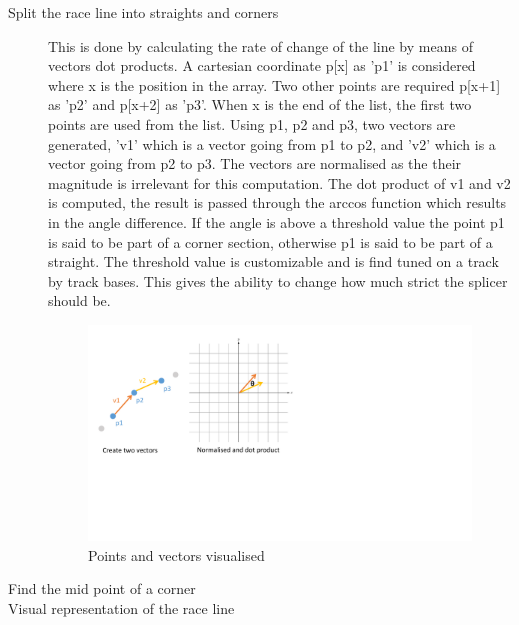 \begin{description}
	\item [Split the race line into straights and corners] This is done by calculating the rate of change of the line by means of vectors dot products. A cartesian coordinate p[x] as 'p1' is considered where x is the position in the array. Two other points are required p[x+1] as 'p2' and p[x+2] as 'p3'. When x is the end of the list, the first two points are used from the list. Using p1, p2 and p3, two vectors are generated, 'v1' which is a vector going from p1 to p2, and 'v2' which is a vector going from p2 to p3. The vectors are normalised as the their magnitude is irrelevant for this computation. The dot product of v1 and v2 is computed, the result is passed through the arccos function which results in the angle difference. If the angle is above a threshold value the point p1 is said to be part of a corner section, otherwise p1 is said to be part of a straight. The threshold value is customizable and is find tuned on a track by track bases. This gives the ability to change how much strict the splicer should be.
	
	\begin{figure}[!htb]
		\centering
		\includegraphics[width=\textwidth]{diagrams/vectorCorners.pdf}
		\caption[Splicing using vectors]{Points and vectors visualised}
		\label{fig:diagram-vectorCorners}
	\end{figure}
	
	\item [Find the mid point of a corner]
	
	\item [Visual representation of the race line]
	
\end{description}
%
